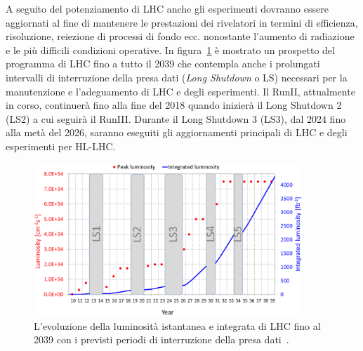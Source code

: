 A seguito del potenziamento di LHC anche gli esperimenti dovranno essere aggiornati al fine di mantenere le prestazioni dei rivelatori in termini di efficienza, risoluzione, reiezione di processi di fondo ecc. nonostante l'aumento di radiazione e le più difficili condizioni operative.
In figura~\ref{HL-LHC} è mostrato un prospetto del programma di LHC fino a tutto il 2039 che contempla anche i prolungati intervalli di interruzione della presa dati ({\em Long Shutdown} o LS) necessari per la manutenzione e l'adeguamento di LHC e degli esperimenti. Il RunII, attualmente in corso, continuerà fino alla fine del 2018 quando inizierà il Long Shutdown 2 (LS2) a cui seguir\`a il RunIII. Durante il Long Shutdown 3 (LS3), dal 2024 fino alla metà del 2026, saranno eseguiti gli aggiornamenti principali di LHC e degli esperimenti per HL-LHC.
\begin{figure}
\centering
\includegraphics[width =0.9\textwidth]{Immagini/LHC_lumi_2010_2039.png}
\caption{L'evoluzione della luminosit\`a istantanea e integrata di LHC fino al 2039 con i previsti periodi di interruzione della presa dati~\cite{CMSCollaboration:2015zni}.}
\label{HL-LHC}
\end{figure}

